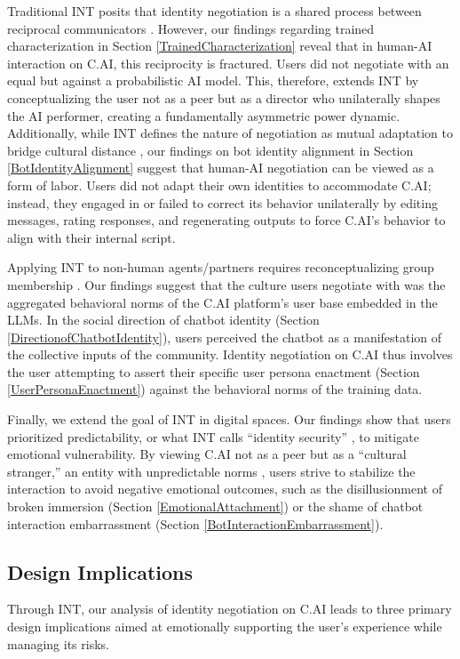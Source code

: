 \documentclass[sigconf, nonacm]{acmart}
\begin{document}
{Traditional INT posits that identity negotiation is a shared process between reciprocal communicators \cite{ting2017identity}. However, our findings regarding trained characterization in Section \ref{TrainedCharacterization} reveal that in human-AI interaction on C.AI, this reciprocity is fractured. Users did not negotiate with an equal but against a probabilistic AI model. This, therefore, extends INT by conceptualizing the user not as a peer but as a director who unilaterally shapes the AI performer, creating a fundamentally asymmetric power dynamic. Additionally, while INT defines the nature of negotiation as mutual adaptation to bridge cultural distance \cite{ting2017identity}, our findings on bot identity alignment in Section \ref{BotIdentityAlignment} suggest that human-AI negotiation can be viewed as a form of labor. Users did not adapt their own identities to accommodate C.AI; instead, they engaged in or failed to correct its behavior unilaterally by editing messages, rating responses, and regenerating outputs to force C.AI's behavior to align with their internal script.

Applying INT to non-human agents/partners requires reconceptualizing group membership \cite{Wang2009Cultural}. Our findings suggest that the culture users negotiate with was the aggregated behavioral norms of the C.AI platform's user base embedded in the LLMs. In the social direction of chatbot identity (Section \ref{DirectionofChatbotIdentity}), users perceived the chatbot as a manifestation of the collective inputs of the community. Identity negotiation on C.AI thus involves the user attempting to assert their specific user persona enactment (Section \ref{UserPersonaEnactment}) against the behavioral norms of the training data.

Finally, we extend the goal of INT in digital spaces. Our findings show that users prioritized predictability, or what INT calls ``identity security'' \cite{ting2017identity}, to mitigate emotional vulnerability. By viewing C.AI not as a peer but as a ``cultural stranger,'' an entity with unpredictable norms \cite{ting2017identity}, users strive to stabilize the interaction to avoid negative emotional outcomes, such as the disillusionment of broken immersion (Section \ref{EmotionalAttachment}) or the shame of chatbot interaction embarrassment (Section \ref{BotInteractionEmbarrassment}).}


\subsection{Design Implications}
Through INT, our analysis of identity negotiation on C.AI leads to three primary design implications aimed at emotionally supporting the user's experience while managing its risks.
\end{document}
